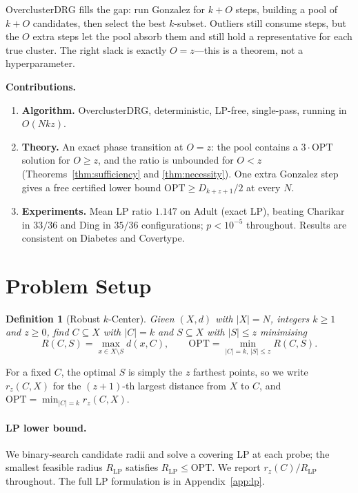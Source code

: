 \documentclass{siam}
\newtheorem{definition}{Definition}
\newcommand{\OPT}{\mathrm{OPT}}
\newcommand{\rz}{r_z}
\begin{document}
OverclusterDRG fills the gap: run Gonzalez for $k+O$ steps, building a
pool of $k+O$ candidates, then select the best $k$-subset. Outliers
still consume steps, but the $O$ extra steps let the pool absorb them
and still hold a representative for each true cluster. The right slack
is exactly $O=z$---this is a theorem, not a hyperparameter.

\noindent\textbf{Contributions.}
\begin{enumerate}
  \item \textbf{Algorithm.} OverclusterDRG, deterministic, LP-free,
  single-pass, running in $O(Nkz)$.
  \item \textbf{Theory.} An exact phase transition at $O=z$: the pool
  contains a $3\cdot\OPT$ solution for $O\ge z$, and the ratio is
  unbounded for $O<z$ (Theorems~\ref{thm:sufficiency} and
  \ref{thm:necessity}). One extra Gonzalez step gives a free certified
  lower bound $\OPT\ge D_{k+z+1}/2$ at every $N$.
  \item \textbf{Experiments.} Mean LP ratio $1.147$ on Adult (exact LP),
  beating Charikar in $33/36$ and Ding in $35/36$ configurations;
  $p<10^{-5}$ throughout. Results are consistent on Diabetes and
  Covertype.
\end{enumerate}

\section{Problem Setup}
\label{sec:setup}

\begin{definition}[Robust $k$-Center]
Given $(X,d)$ with $|X|=N$, integers $k\ge1$ and $z\ge0$, find
$C\subseteq X$ with $|C|=k$ and $S\subseteq X$ with $|S|\le z$
minimising
\[
  R(C,S) = \max_{x\in X\setminus S} d(x,C), \qquad
  \OPT = \min_{|C|=k,\,|S|\le z} R(C,S).
\]
\end{definition}

For a fixed $C$, the optimal $S$ is simply the $z$ farthest points,
so we write $\rz(C,X)$ for the $(z{+}1)$-th largest distance from
$X$ to $C$, and $\OPT=\min_{|C|=k}\rz(C,X)$.

\paragraph{LP lower bound.}
We binary-search candidate radii and solve a covering LP at each
probe; the smallest feasible radius $R_{\mathrm{LP}}$ satisfies
$R_{\mathrm{LP}}\le\OPT$. We report $\rz(C)/R_{\mathrm{LP}}$
throughout. The full LP formulation is in Appendix~\ref{app:lp}.
\end{document}

